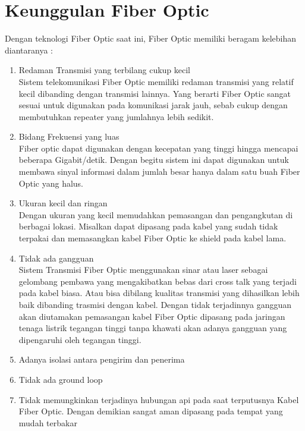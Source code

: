 \section{Keunggulan Fiber Optic}
\begin{flushleft}
Dengan teknologi Fiber Optic saat ini, Fiber Optic memiliki beragam kelebihan diantaranya : \\
\begin{enumerate}
\item Redaman Transmisi yang terbilang cukup kecil \\ Sistem telekomunikasi Fiber Optic memiliki redaman transmisi yang relatif kecil dibanding dengan transmisi lainnya. Yang berarti Fiber Optic sangat sesuai untuk digunakan pada komunikasi jarak jauh, sebab cukup dengan membutuhkan repeater yang jumlahnya lebih sedikit.
\item  Bidang Frekuensi yang luas \\ Fiber optic dapat digunakan dengan kecepatan yang tinggi hingga mencapai beberapa Gigabit/detik. Dengan begitu sistem ini dapat digunakan untuk membawa sinyal informasi dalam jumlah besar hanya dalam satu buah Fiber Optic yang halus.
\item Ukuran kecil dan ringan \\ Dengan ukuran yang kecil memudahkan pemasangan dan pengangkutan di berbagai lokasi. Misalkan dapat dipasang pada kabel yang sudah tidak terpakai dan memasangkan kabel Fiber Optic ke shield pada kabel lama.
\item Tidak ada gangguan \\ Sistem Transmisi Fiber Optic menggunakan sinar atau laser sebagai gelombang pembawa yang mengakibatkan bebas dari cross talk yang terjadi pada kabel biasa. Atau bisa dibilang kualitas transmisi yang dihasilkan lebih baik dibanding trasmisi dengan kabel. Dengan tidak terjadinnya gangguan akan diutamakan pemasangan kabel Fiber Optic dipasang pada jaringan tenaga listrik tegangan tinggi tanpa khawati akan adanya gangguan yang dipengaruhi oleh tegangan tinggi.
\item Adanya isolasi antara pengirim dan penerima
\item Tidak ada ground loop
\item Tidak memungkinkan terjadinya hubungan api pada saat terputusnya Kabel Fiber Optic. Dengan demikian sangat aman dipasang pada tempat yang mudah terbakar
\end{enumerate}
\end{flushleft}
